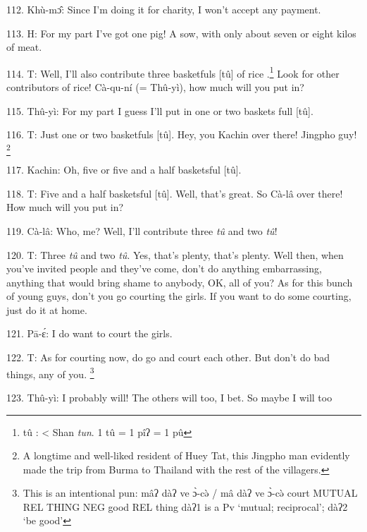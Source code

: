 112. Khù-mɔ̂: Since I'm doing it for charity, I won't accept any payment.

113. H: For my part I've got one pig!  A sow, with only about seven or eight kilos
of meat.

114. T: Well, I'll also contribute three basketfuls [tû] of rice .\footnote{tû : < Shan \textit{tun}.  1 tû = 1 pîʔ = 1 pû}  Look for
other contributors of rice!  Cà-qu-ní (= Thû-yì), how much will you put in?

115. Thû-yì: For my part I guess I'll put in one or two baskets full [tû].

116. T: Just one or two basketfuls [tû].  Hey, you Kachin over there!  Jingpho
guy! \footnote{A longtime and well-liked resident of Huey Tat, this Jingpho man evidently made the trip from Burma to Thailand with the rest of the villagers.}

117. Kachin: Oh, five or five and a half basketsful [tû].

118. T: Five and a half basketsful [tû].  Well, that's great.  So Cà-lâ over
there!  How much will you put in?

119. Cà-lâ: Who, me?  Well, I'll contribute three \textit{tû }and two \textit{tû}!

120. T: Three \textit{tû }and two \textit{tû}.  Yes, that's plenty, that's plenty.
Well then, when you've invited people and they've come, don't do anything embarrassing,
anything that would bring shame to anybody, OK, all of you?  As for this bunch
of young guys, don't you go courting the girls.  If you want to do some courting,
just do it at home.

121. Pā-ɛ́: I do want to court the girls.

122. T: As for courting now, do go and court each other.  But don't do bad things,
any of you. \footnote{This is an intentional pun: mâʔ   dàʔ   ve  ɔ̀-cə̀ /   mâ  dàʔ ve    ɔ̀-cə̀  court  MUTUAL  REL  THING NEG good REL thing  dàʔ1 is a Pv `mutual; reciprocal'; dàʔ2 `be good'}

123. Thû-yì: I probably will!  The others will too, I bet.  So maybe I will too
